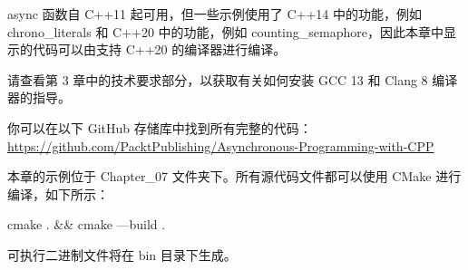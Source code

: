 async 函数自 C++11 起可用，但一些示例使用了 C++14 中的功能，例如 chrono\_literals 和 C++20 中的功能，例如 counting\_semaphore，因此本章中显示的代码可以由支持 C++20 的编译器进行编译。

请查看第 3 章中的技术要求部分，以获取有关如何安装 GCC 13 和 Clang 8 编译器的指导。

你可以在以下 GitHub 存储库中找到所有完整的代码： \url{https://github.com/PacktPublishing/Asynchronous-Programming-with-CPP}

本章的示例位于 Chapter\_07 文件夹下。所有源代码文件都可以使用 CMake 进行编译，如下所示：

\begin{shell}
cmake . && cmake —build .
\end{shell}

可执行二进制文件将在 bin 目录下生成。